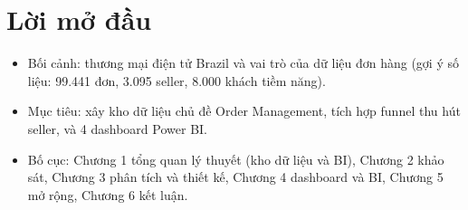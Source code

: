 \chapter*{Lời mở đầu}
\begin{itemize}
  \item Bối cảnh: thương mại điện tử Brazil và vai trò của dữ liệu đơn hàng (gợi ý số liệu: 99.441 đơn, 3.095 seller, 8.000 khách tiềm năng).
  \item Mục tiêu: xây kho dữ liệu chủ đề Order Management, tích hợp funnel thu hút seller, và 4 dashboard Power BI.
  \item Bố cục: Chương 1 tổng quan lý thuyết (kho dữ liệu và BI), Chương 2 khảo sát, Chương 3 phân tích và thiết kế, Chương 4 dashboard và BI, Chương 5 mở rộng, Chương 6 kết luận.
\end{itemize}
